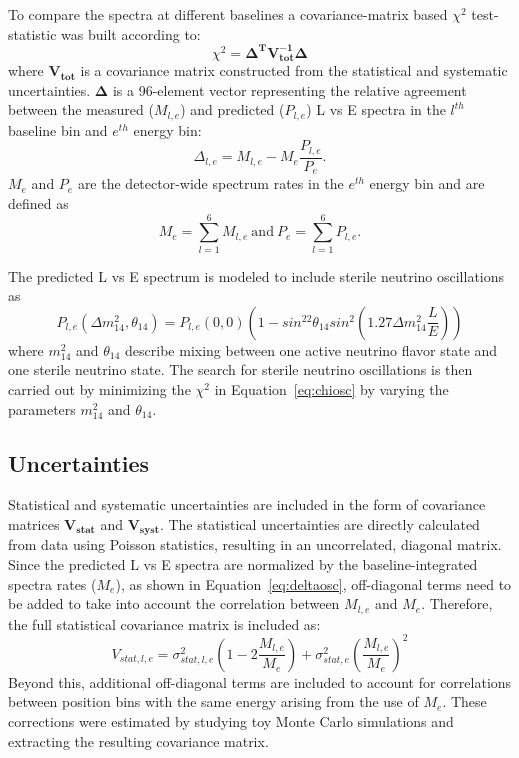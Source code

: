 To compare the spectra at different baselines a covariance-matrix based $\chi^2$ test-statistic was built according to:
\begin{equation}	
	\chi^2 = \mathbf{\Delta^TV^{-1}_{tot}\Delta}
	\label{eq:chiosc}
\end{equation}
where $\mathbf{V_{tot}}$ is a covariance matrix constructed from the statistical and systematic uncertainties.
$\mathbf{\Delta}$ is a 96-element vector representing the relative agreement between the measured ($M_{l,e}$) and predicted ($P_{l,e}$) L vs E spectra in the $l^{th}$ baseline bin and $e^{th}$ energy bin:
\begin{equation}
	\Delta_{l,e} = M_{l,e} - M_e\frac{P_{l,e}}{P_e}.
	\label{eq:deltaosc}
\end{equation}
$M_e$ and $P_e$ are the detector-wide spectrum rates in the $e^{th}$ energy bin and are defined as
\begin{equation}
	M_e = \sum_{l=1}^{6}M_{l,e}~\textrm{and}~P_e = \sum_{l=1}^{6}P_{l,e}.
\end{equation}

The predicted L vs E spectrum is modeled to include sterile neutrino oscillations as
\begin{equation}
	P_{l,e}(\Delta m_{14}^2,\theta_{14}) = P_{l,e}(0,0)\left(1-sin^22\theta_{14}sin^2\left(1.27\Delta m_{14}^2\frac{L}{E}   \right)\right)
\end{equation}
where $m_{14}^2$ and $\theta_{14}$ describe mixing between one active neutrino flavor state and one sterile neutrino state.
The search for sterile neutrino oscillations is then carried out by minimizing the $\chi^2$ in Equation~\ref{eq:chiosc} by varying the parameters $m_{14}^2$ and $\theta_{14}$.

\subsection{Uncertainties}

Statistical and systematic uncertainties are included in the form of covariance matrices $\mathbf{V_{stat}}$ and $\mathbf{V_{syst}}$.
The statistical uncertainties are directly calculated from data using Poisson statistics, resulting in an uncorrelated, diagonal matrix.
Since the predicted L vs E spectra are normalized by the baseline-integrated spectra rates ($M_e$), as shown in Equation~\ref{eq:deltaosc}, off-diagonal terms need to be added to take into account the correlation between $M_{l,e}$ and $M_e$.
Therefore, the full statistical covariance matrix is included as:
\begin{equation}
	V_{stat,l,e} = \sigma^2_{stat,l,e}\left(1-2\frac{M_{l,e}}{M_e}\right) + \sigma^2_{stat,e}\left(\frac{M_{l,e}}{M_e}\right)^2
\end{equation}
Beyond this, additional off-diagonal terms are included to account for correlations between position bins with the same energy arising from the use of $M_e$.
These corrections were estimated by studying toy Monte Carlo simulations and extracting the resulting covariance matrix.


